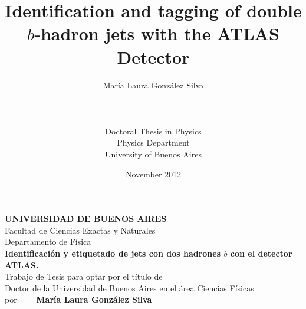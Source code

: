 \documentclass[11pt,a4paper,12pt]{report}
\title{Identification and tagging of double $b$-hadron jets with the ATLAS Detector}
\author{Mar\'ia Laura Gonz\'alez Silva \\ \\ \\ \\Doctoral Thesis in Physics\\Physics Department\\University of Buenos Aires}
\date{November 2012}
\begin{document}
\maketitle


\newpage

\thispagestyle{empty}
\begin{figure}[h]
  \begin{center}
  \end{center}
\end{figure}

\begin{center}
  {\bfseries UNIVERSIDAD DE BUENOS AIRES}\\
  \vspace{0.5cm}
  Facultad de Ciencias Exactas y Naturales\\
  \vspace{0.5cm}
  Departamento de F\'isica\\
  \vspace{1.5cm}
         {\large {\bfseries Identificaci\'on y etiquetado de jets con dos hadrones $b$ con el detector ATLAS.}}\\  %
         \vspace{1.5cm}
         Trabajo de Tesis para optar por el t\'itulo de \\
         Doctor de la Universidad de Buenos Aires en el \'area Ciencias F\'isicas\\
         \vspace{1.5cm}
         por $\qquad ${\bfseries Mar\'ia Laura Gonz\'alez Silva}\\
         \vspace{1.5cm}
\end{center}
\end{document}

